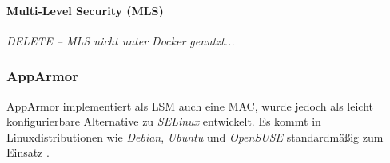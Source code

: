 \documentclass[../main.tex]{subfiles}
\begin{document}
				\paragraph{Multi-Level Security (MLS)}
					\emph{DELETE -- MLS nicht unter Docker genutzt...}







      \subsubsection{AppArmor}
				AppArmor implementiert als LSM auch eine MAC, wurde jedoch als leicht konfigurierbare Alternative zu \emph{SELinux} entwickelt. Es kommt in Linuxdistributionen wie \emph{Debian}, \emph{Ubuntu} und \emph{OpenSUSE} standardmäßig zum Einsatz \cite{apparmorUbuntu}.
\end{document}
